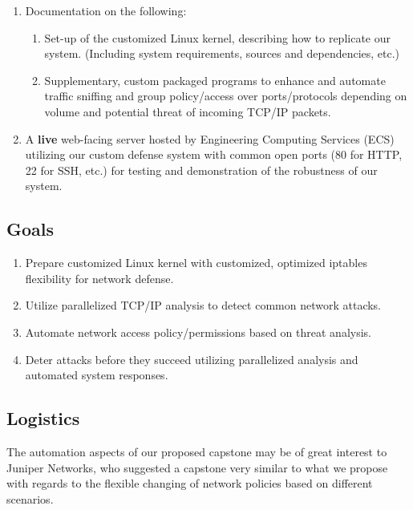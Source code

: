\begin{enumerate}
	\item Documentation on the following:
	\begin{enumerate}
		\item  Set-up of the customized Linux kernel, describing how to replicate our system. (Including
		system requirements, sources and dependencies, etc.)
		\item Supplementary, custom packaged programs to enhance and automate traffic sniffing and
		group policy/access over ports/protocols depending on volume and potential threat of incoming
		TCP/IP packets.
	\end{enumerate}
	
	\item A {\textbf{live}} web-facing server hosted by Engineering Computing Services (ECS) utilizing our custom
	defense system with common open ports (80 for HTTP, 22 for SSH, etc.) for testing and
	demonstration of the robustness of our system.

\end{enumerate}

\subsection{Goals}

\begin{enumerate}
\item Prepare customized Linux kernel with customized, optimized iptables flexibility for
network defense.
\item Utilize parallelized TCP/IP analysis to detect common network attacks.
\item Automate network access policy/permissions based on threat analysis.
\item Deter attacks before they succeed utilizing parallelized analysis and automated system responses.

\end{enumerate}

\subsection{Logistics}

The automation aspects of our proposed capstone may be of great interest to Juniper Networks, who
suggested a capstone very similar to what we propose with regards to the flexible changing of network
policies based on different scenarios.

